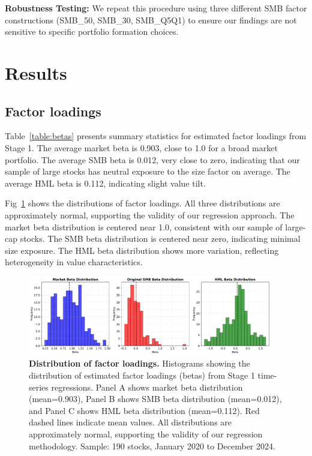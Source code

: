 \documentclass[10pt,letterpaper]{article}
\begin{document}
\textbf{Robustness Testing:} We repeat this procedure using three different SMB factor constructions (SMB\_50, SMB\_30, SMB\_Q5Q1) to ensure our findings are not sensitive to specific portfolio formation choices.

\section*{Results}

\subsection*{Factor loadings}

Table~\ref{table:betas} presents summary statistics for estimated factor loadings from Stage 1. The average market beta is 0.903, close to 1.0 for a broad market portfolio. The average SMB beta is 0.012, very close to zero, indicating that our sample of large stocks has neutral exposure to the size factor on average. The average HML beta is 0.112, indicating slight value tilt.

Fig~\ref{fig:beta_dist} shows the distributions of factor loadings. All three distributions are approximately normal, supporting the validity of our regression approach. The market beta distribution is centered near 1.0, consistent with our sample of large-cap stocks. The SMB beta distribution is centered near zero, indicating minimal size exposure. The HML beta distribution shows more variation, reflecting heterogeneity in value characteristics.

\begin{figure}[!h]
\centering
\includegraphics[width=0.95\textwidth]{figures/fig1_beta_distributions.pdf}
\caption{\textbf{Distribution of factor loadings.}
Histograms showing the distribution of estimated factor loadings (betas) from Stage 1 time-series regressions. Panel A shows market beta distribution (mean=0.903), Panel B shows SMB beta distribution (mean=0.012), and Panel C shows HML beta distribution (mean=0.112). Red dashed lines indicate mean values. All distributions are approximately normal, supporting the validity of our regression methodology. Sample: 190 stocks, January 2020 to December 2024.}
\label{fig:beta_dist}
\end{figure}
\end{document}
